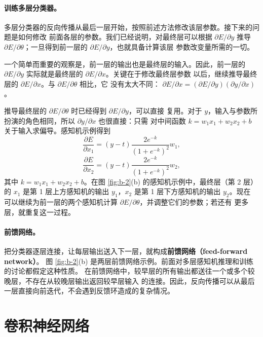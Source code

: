 \paragraph{训练多层分类器。}
多层分类器的反向传播从最后一层开始，按照前述方法修改该层参数。接下来的问题是如何修改
前面各层的参数。我们已经说明，对最终层可以根据 $\partial E/\partial y$ 推导
$\partial E/\partial\theta$；一旦得到前一层的 $\partial E/\partial y$，也就具备计算该层
参数改变量所需的一切。

一个简单而重要的观察是，前一层的输出也是最终层的输入。因此，前一层的
$\partial E/\partial y$ 实际就是最终层的 $\partial E/\partial x$。关键在于修改最终层参数
以后，继续推导最终层的 $\partial E/\partial x$。与 $\partial E/\partial\theta$ 相比，它
没有太大不同：
$\partial E/\partial x=(\partial E/\partial y)(\partial y/\partial x)$。

推导最终层的 $\partial E/\partial\theta$ 时已经得到 $\partial E/\partial y$，可以直接
复用。对于 $y$，输入与参数所扮演的角色相同，所以 $\partial y/\partial x$ 也很直接：只需
对中间函数 $k=w_1x_1+w_2x_2+b$ 关于输入求偏导。感知机示例得到
\begin{equation}
  \frac{\partial E}{\partial x_1}=(y-t)\frac{2e^{-k}}{(1+e^{-k})^2}w_1,
  \label{eq:appb-18}
\end{equation}
\begin{equation}
  \frac{\partial E}{\partial x_2}=(y-t)\frac{2e^{-k}}{(1+e^{-k})^2}w_2,
  \label{eq:appb-19}
\end{equation}
其中 $k=w_1x_1+w_2x_2+b$。在图 \ref{fig:b-2}(b) 的感知机示例中，最终层（第 2 层）
的 $x_1$ 是第 1 层上方感知机的输出 $y_1$，$x_2$ 是第 1 层下方感知机的输出 $y_2$。现在
可以继续为前一层的两个感知机计算 $\partial E/\partial\theta$，并调整它们的参数；若还有
更多层，就重复这一过程。

\paragraph{前馈网络。}
把分类器逐层连接，让每层输出送入下一层，就构成\textbf{前馈网络（feed-forward network）}。
图 \ref{fig:b-2}(b) 是两层前馈网络示例。前面对多层感知机推理和训练的讨论都假定这种性质。
在前馈网络中，较早层的所有输出都送往一个或多个较晚层，不存在从较晚层输出返回较早层输入
的连接。因此，反向传播可以从最后一层直接向前迭代，不会遇到反馈环造成的复杂情况。

\section{卷积神经网络}
\label{sec:appb-cnn}


